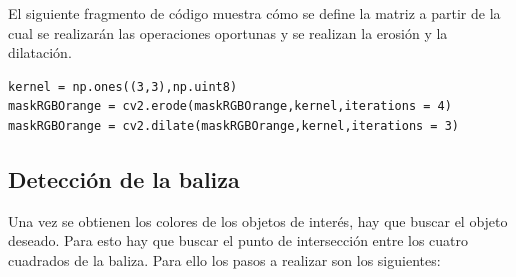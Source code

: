 \hspace{1 cm} El siguiente fragmento de c\'odigo muestra c\'omo se define la matriz a partir de la cual se realizar\'an las operaciones oportunas y se realizan la erosi\'on y la dilataci\'on.
\begin{lstlisting}[backgroundcolor=\color{yellow}]
kernel = np.ones((3,3),np.uint8)
maskRGBOrange = cv2.erode(maskRGBOrange,kernel,iterations = 4)
maskRGBOrange = cv2.dilate(maskRGBOrange,kernel,iterations = 3)
\end{lstlisting}


\subsection{Detecci\'on de la baliza}
\hspace{1 cm} Una vez se obtienen los colores de los objetos de inter\'es, hay que buscar el objeto deseado. Para esto hay que buscar el punto de intersecci\'on entre los cuatro cuadrados de la baliza. Para ello los pasos a realizar son los siguientes:

